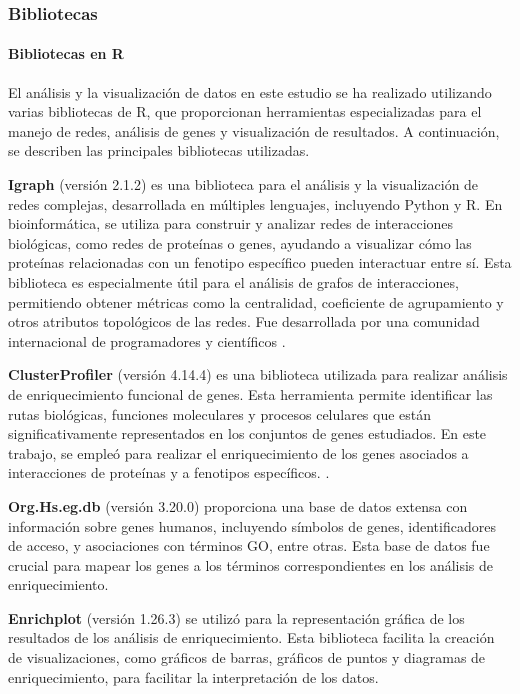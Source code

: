 \subsubsection{Bibliotecas}


\paragraph{Bibliotecas en R}

El análisis y la visualización de datos en este estudio se ha realizado utilizando varias bibliotecas de R, que proporcionan herramientas especializadas para el manejo de redes, análisis de genes y visualización de resultados. A continuación, se describen las principales bibliotecas utilizadas.

\textbf{Igraph} (versión 2.1.2) es una biblioteca para el análisis y la visualización de redes complejas, desarrollada en múltiples lenguajes, incluyendo Python y R. En bioinformática, se utiliza para construir y analizar redes de interacciones biológicas, como redes de proteínas o genes, ayudando a visualizar cómo las proteínas relacionadas con un fenotipo específico pueden interactuar entre sí. Esta biblioteca es especialmente útil para el análisis de grafos de interacciones, permitiendo obtener métricas como la centralidad, coeficiente de agrupamiento y otros atributos topológicos de las redes. Fue desarrollada por una comunidad internacional de programadores y científicos\cite{valdez2016analisis} \cite{igraphref} \cite{igraphmanual}.

\textbf{ClusterProfiler} (versión 4.14.4) es una biblioteca utilizada para realizar análisis de enriquecimiento funcional de genes. Esta herramienta permite identificar las rutas biológicas, funciones moleculares y procesos celulares que están significativamente representados en los conjuntos de genes estudiados. En este trabajo, se empleó para realizar el enriquecimiento de los genes asociados a interacciones de proteínas y a fenotipos específicos. \cite{clusterprofiler1} \cite{clusterprofiler2} \cite{clusterprofiler3} \cite{clusterprofiler4}.

\textbf{Org.Hs.eg.db} (versión 3.20.0) proporciona una base de datos extensa con información sobre genes humanos, incluyendo símbolos de genes, identificadores de acceso, y asociaciones con términos GO, entre otras. Esta base de datos fue crucial para mapear los genes a los términos correspondientes en los análisis de enriquecimiento. \cite{org.Hs.eg.db_manual}

\textbf{Enrichplot} (versión 1.26.3) se utilizó para la representación gráfica de los resultados de los análisis de enriquecimiento. Esta biblioteca facilita la creación de visualizaciones, como gráficos de barras, gráficos de puntos y diagramas de enriquecimiento, para facilitar la interpretación de los datos. \cite{enrichplotmanual}

